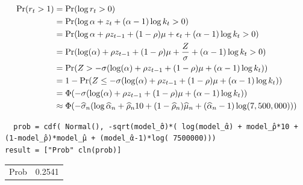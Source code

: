 \documentclass[12pt, letterpaper]{paper}
\begin{document}
\begin{align*}
    \Pr( r_t > 1) &= \Pr( \log r_t > 0)\\
                  &= \Pr( \log \alpha + z_t + (\alpha - 1)\log k_t > 0)\\
                  &= \Pr( \log \alpha + \rho z_{t-1} + (1 - \rho)\mu + \epsilon_t + (\alpha-1) \log k_t > 0)\\
    &= \Pr( \log(\alpha) + \rho z_{t-1} + (1-\rho)\mu + \frac{Z}{\sigma} + (\alpha-1) \log k_t
      > 0)\\
                  &= \Pr( Z > - \sigma ( \log(\alpha) + \rho z_{t-1} + (1-\rho)\mu + (\alpha-1)\log k_t))\\
    &= 1 - \Pr( Z \leq - \sigma ( \log(\alpha) + \rho z_{t-1} + (1-\rho)\mu + (\alpha-1)\log
      k_t))\\
                  &= \Phi( - \sigma ( \log(\alpha) + \rho z_{t-1} + (1-\rho)\mu + (\alpha-1)\log k_t ))\\
    &\approx \Phi( -\widehat{ \sigma }_{n} ( \log \widehat{ \alpha }_{n} + \widehat{ \rho }_{n}10 + (1-\widehat{ \rho }_{n})
      \widehat{ \mu }_{n} + (\widehat{ \alpha }_{n} - 1) \log( 7,500,000) ))\\
  \end{align*}

\begin{verbatim}
  prob = cdf( Normal(), -sqrt(model_̂σ)*( log(model_̂α) + model_̂ρ*10 + (1-model_̂ρ)*model_̂μ + (model_̂α-1)*log( 7500000)))
result = ["Prob" cln(prob)]

\end{verbatim}

\begin{center}
\begin{tabular}{lr}
Prob & 0.2541\\
\end{tabular}
\end{center}
\end{document}
